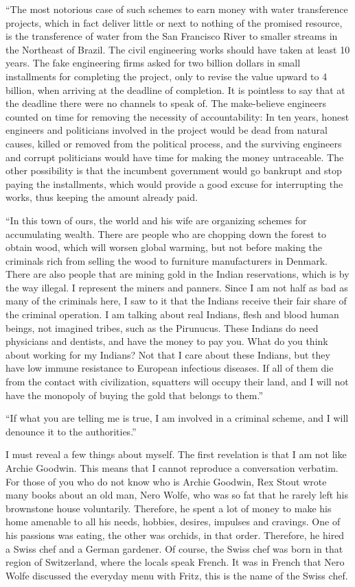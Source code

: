 \documentclass[
  12pt,
]{book}
\begin{document}
``The most notorious case of such schemes to earn money with water
transference projects, which in fact deliver little or next to nothing
of the promised resource, is the transference of water from the San
Francisco River to smaller streams in the Northeast of Brazil. The civil
engineering works should have taken at least 10 years. The fake
engineering firms asked for two billion dollars in small installments
for completing the project, only to revise the value upward to 4
billion, when arriving at the deadline of completion. It is pointless to
say that at the deadline there were no channels to speak of. The
make-believe engineers counted on time for removing the necessity of
accountability: In ten years, honest engineers and politicians involved
in the project would be dead from natural causes, killed or removed from
the political process, and the surviving engineers and corrupt
politicians would have time for making the money untraceable. The other
possibility is that the incumbent government would go bankrupt and stop
paying the installments, which would provide a good excuse for
interrupting the works, thus keeping the amount already paid.

``In this town of ours, the world and his wife are organizing schemes
for accumulating wealth. There are people who are chopping down the
forest to obtain wood, which will worsen global warming, but not before
making the criminals rich from selling the wood to furniture
manufacturers in Denmark. There are also people that are mining gold in
the Indian reservations, which is by the way illegal. I represent the
miners and panners. Since I am not half as bad as many of the criminals
here, I saw to it that the Indians receive their fair share of the
criminal operation. I am talking about real Indians, flesh and blood
human beings, not imagined tribes, such as the Pirunucus. These Indians
do need physicians and dentists, and have the money to pay you. What do
you think about working for my Indians? Not that I care about these
Indians, but they have low immune resistance to European infectious
diseases. If all of them die from the contact with civilization,
squatters will occupy their land, and I will not have the monopoly of
buying the gold that belongs to them.''

``If what you are telling me is true, I am involved in a criminal
scheme, and I will denounce it to the authorities.''

I must reveal a few things about myself. The first revelation is that I
am not like Archie Goodwin. This means that I cannot reproduce a
conversation verbatim. For those of you who do not know who is Archie
Goodwin, Rex Stout wrote many books about an old man, Nero Wolfe, who
was so fat that he rarely left his brownstone house voluntarily.
Therefore, he spent a lot of money to make his home amenable to all his
needs, hobbies, desires, impulses and cravings. One of his passions was
eating, the other was orchids, in that order. Therefore, he hired a
Swiss chef and a German gardener. Of course, the Swiss chef was born in
that region of Switzerland, where the locals speak French. It was in
French that Nero Wolfe discussed the everyday menu with Fritz, this is
the name of the Swiss chef.
\end{document}

